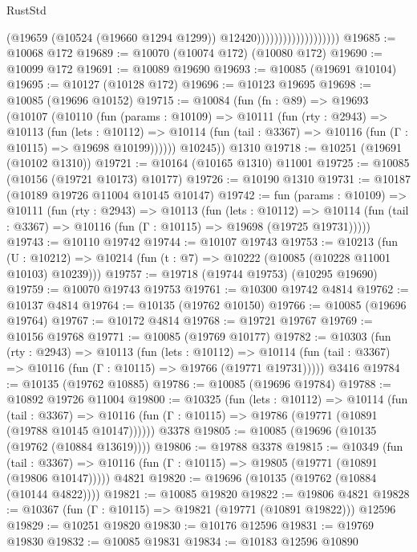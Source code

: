 \begin{lexlean}{RustStd}
\begin{coremodule}
                                        (@19659
                                          (@10524 (@19660 @1294 @1299))
                                          @12420)))))))))))))))))))
@19685 := @10068 @172
@19689 := @10070 (@10074 @172) (@10080 @172)
@19690 := @10099 @172
@19691 := @10089 @19690
@19693 := @10085 (@19691 @10104)
@19695 := @10127 (@10128 @172)
@19696 := @10123 @19695
@19698 := @10085 (@19696 @10152)
@19715 := @10084
    (fun (fn : @89) =>
    @19693
      (@10107
        (@10110
          (fun (params : @10109) =>
          @10111
            (fun (rty : @2943) =>
            @10113
              (fun (lets : @10112) =>
              @10114 (fun (tail : @3367) => @10116 (fun (Γ : @10115) => @19698 @10199))))))
        @10245))
    @1310
@19718 := @10251 (@19691 (@10102 @1310))
@19721 := @10164 (@10165 @1310) @11001
@19725 := @10085 (@10156 (@19721 @10173) @10177)
@19726 := @10190 @1310
@19731 := @10187 (@10189 @19726 @11004 @10145 @10147)
@19742 := fun (params : @10109) =>
  @10111
    (fun (rty : @2943) =>
    @10113
      (fun (lets : @10112) =>
      @10114 (fun (tail : @3367) => @10116 (fun (Γ : @10115) => @19698 (@19725 @19731)))))
@19743 := @10110 @19742
@19744 := @10107 @19743
@19753 := @10213
    (fun (U : @10212) => @10214 (fun (t : @7) => @10222 (@10085 (@10228 @11001 @10103) @10239)))
@19757 := @19718 (@19744 @19753) (@10295 @19690)
@19759 := @10070 @19743 @19753
@19761 := @10300 @19742 @4814
@19762 := @10137 @4814
@19764 := @10135 (@19762 @10150)
@19766 := @10085 (@19696 @19764)
@19767 := @10172 @4814
@19768 := @19721 @19767
@19769 := @10156 @19768
@19771 := @10085 (@19769 @10177)
@19782 := @10303
    (fun (rty : @2943) =>
    @10113
      (fun (lets : @10112) =>
      @10114 (fun (tail : @3367) => @10116 (fun (Γ : @10115) => @19766 (@19771 @19731)))))
    @3416
@19784 := @10135 (@19762 @10885)
@19786 := @10085 (@19696 @19784)
@19788 := @10892 @19726 @11004
@19800 := @10325
    (fun (lets : @10112) =>
    @10114
      (fun (tail : @3367) =>
      @10116 (fun (Γ : @10115) => @19786 (@19771 (@10891 (@19788 @10145 @10147))))))
    @3378
@19805 := @10085 (@19696 (@10135 (@19762 (@10884 @13619))))
@19806 := @19788 @3378
@19815 := @10349
    (fun (tail : @3367) => @10116 (fun (Γ : @10115) => @19805 (@19771 (@10891 (@19806 @10147)))))
    @4821
@19820 := @19696 (@10135 (@19762 (@10884 (@10144 @4822))))
@19821 := @10085 @19820
@19822 := @19806 @4821
@19828 := @10367 (fun (Γ : @10115) => @19821 (@19771 (@10891 @19822))) @12596
@19829 := @10251 @19820
@19830 := @10176 @12596
@19831 := @19769 @19830
@19832 := @10085 @19831
@19834 := @10183 @12596 @10890

\end{coremodule}
\end{lexlean}
